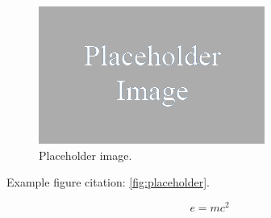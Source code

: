 \documentclass[fontsize=11pt, %
                             paper=a4, %
                             oneside, %
                             captions=tableheading,
                             index=totoc,
                             hyperref]{labbook}
\begin{document}


\lipsum[4]

\begin{figure}[h!]
\includegraphics[scale=0.5,keepaspectratio=true]{placeholder.png}
\caption{Placeholder image.}
\label{fig:placeholder}
\end{figure}

\lipsum[5]

Example figure citation: \autoref{fig:placeholder}.



\lipsum[6]



\lipsum[7]



\lipsum[8]



  
\lipsum[9]




\lipsum[10]

\begin{equation}
\label{eq:emc}
e = mc^2
\end{equation}
\end{document}
